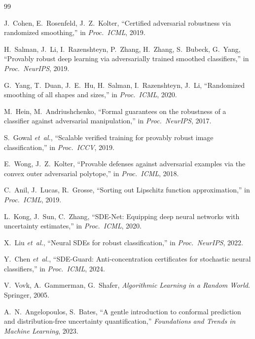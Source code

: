 \documentclass[journal,twoside]{IEEEtran}
\begin{document}
\balance
\begin{thebibliography}{99}

J.~Cohen, E.~Rosenfeld, J.~Z.~Kolter,
``Certified adversarial robustness via randomized smoothing,'' in
\emph{Proc.\ ICML}, 2019.

H.~Salman, J.~Li, I.~Razenshteyn, P.~Zhang, H.~Zhang, S.~Bubeck,
G.~Yang,
``Provably robust deep learning via adversarially trained smoothed
classifiers,'' in \emph{Proc.\ NeurIPS}, 2019.

G.~Yang, T.~Duan, J.~E.~Hu, H.~Salman, I.~Razenshteyn, J.~Li,
``Randomized smoothing of all shapes and sizes,'' in
\emph{Proc.\ ICML}, 2020.

M.~Hein, M.~Andriushchenko,
``Formal guarantees on the robustness of a classifier against
adversarial manipulation,'' in \emph{Proc.\ NeurIPS}, 2017.

S.~Gowal \emph{et~al.},
``Scalable verified training for provably robust image classification,''
in \emph{Proc.\ ICCV}, 2019.

E.~Wong, J.~Z.~Kolter,
``Provable defenses against adversarial examples via the convex outer
adversarial polytope,'' in \emph{Proc.\ ICML}, 2018.

C.~Anil, J.~Lucas, R.~Grosse,
``Sorting out Lipschitz function approximation,'' in
\emph{Proc.\ ICML}, 2019.

L.~Kong, J.~Sun, C.~Zhang,
``SDE-Net: Equipping deep neural networks with uncertainty
estimates,'' in \emph{Proc.\ ICML}, 2020.

X.~Liu \emph{et~al.},
``Neural SDEs for robust classification,'' in \emph{Proc.\ NeurIPS}, 2022.

Y.~Chen \emph{et~al.},
``SDE-Guard: Anti-concentration certificates for stochastic neural
classifiers,'' in \emph{Proc.\ ICML}, 2024.

V.~Vovk, A.~Gammerman, G.~Shafer,
\emph{Algorithmic Learning in a Random World}.
Springer, 2005.

A.~N.~Angelopoulos, S.~Bates,
``A gentle introduction to conformal prediction and distribution-free
uncertainty quantification,''
\emph{Foundations and Trends in Machine Learning}, 2023.


\end{thebibliography}
\end{document}
